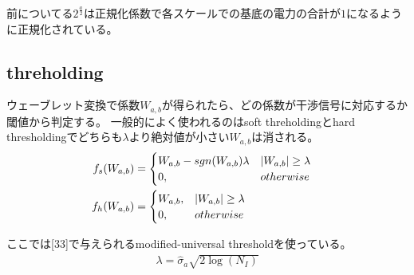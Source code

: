前についてる$2^{\frac{a}{2}}$は正規化係数で各スケールでの基底の電力の合計が$1$になるように正規化されている。

\subsection{threholding}
ウェーブレット変換で係数$W_{a,b}$が得られたら、どの係数が干渉信号に対応するか閾値から判定する。
一般的によく使われるのはsoft threholdingとhard thresholdingでどちらも$\lambda$より絶対値が小さい$W_{a,b}$は消される。
\begin{align}
    f_s(W_{a,b}) &= 
        \begin{cases}
            W_{a,b}-sgn(W_{a,b})\lambda & |W_{a,b}|\geq \lambda \\
            0, & otherwise
        \end{cases} \cr
    f_h(W_{a,b}) &= 
    \begin{cases}
        W_{a,b}, & |W_{a,b}|\geq \lambda \\
        0, & otherwise
    \end{cases} 
\end{align}

ここでは[33]で与えられるmodified-universal thresholdを使っている。
\begin{align}
    \lambda = \hat{\sigma}_a \sqrt{2\log(N_I)}
\end{align}